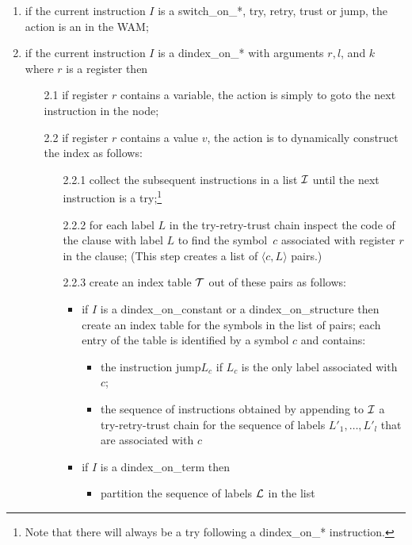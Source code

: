 \documentclass{llncs}
\newcommand{\instr}[1]{\textsf{#1}}
\newcommand{\try}{\instr{try}\xspace}
\newcommand{\retry}{\mbox{\instr{retry}}\xspace}
\newcommand{\trust}{\instr{trust}\xspace}
\newcommand{\TryRetryTrust}{\mbox{\instr{try-retry-trust}}\xspace}
\newcommand{\jump}{\instr{jump}\xspace}
\newcommand{\jitiSTAR}{\mbox{\instr{dindex\_on\_*}}\xspace}
\newcommand{\switchSTAR}{\mbox{\instr{switch\_on\_*}}\xspace}
\newcommand{\jitiONterm}{\mbox{\instr{dindex\_on\_term}}\xspace}
\newcommand{\jitiONconstant}{\mbox{\instr{dindex\_on\_constant}}\xspace}
\newcommand{\jitiONstructure}{\mbox{\instr{dindex\_on\_structure}}\xspace}
\newcommand{\JITI}{demand-driven indexing\xspace}
\begin{document}
\begin{Algorithm}[t]
  \caption{Actions of the abstract machine with \JITI}
  \label{alg:construction}
  \begin{enumerate}
  \item if the current instruction $I$ is a \switchSTAR, \try, \retry,
    \trust or \jump, the action is an in the WAM;
  \item if the current instruction $I$ is a \jitiSTAR with arguments $r,
    l$, and $k$ where $r$ is a register then
    \begin{enumerate}
    \item[2.1] if register $r$ contains a variable, the action is simply to
      \instr{goto} the next instruction in the node;
    \item[2.2] if register $r$ contains a value $v$, the action is to
      dynamically construct the index as follows:
      \begin{itemize}
      \item[2.2.1] collect the subsequent instructions in a list $\cal I$
	until the next instruction is a \try;\footnote{Note that there
	will always be a \try following a \jitiSTAR instruction.}
      \item[2.2.2] for each label $L$ in the \TryRetryTrust chain
	inspect the code of the clause with label $L$ to find the
	symbol~$c$ associated with register $r$ in the clause; (This
	step creates a list of $\langle c, L \rangle$ pairs.)
      \item[2.2.3] create an index table $\cal T$ out of these pairs as
	follows:
	\begin{itemize}
	\item if $I$ is a \jitiONconstant or a \jitiONstructure then
	  create an index table for the symbols in the list of pairs;
	  each entry of the table is identified by a symbol $c$ and
	  contains:
	  \begin{itemize}
	  \item the instruction \jump $L_c$ if $L_c$ is the only label
	    associated with $c$;
	  \item the sequence of instructions obtained by appending to
	    $\cal I$ a \TryRetryTrust chain for the sequence of labels
	    $L'_1, \ldots, L'_l$ that are associated with $c$
	  \end{itemize}
	\item if $I$ is a \jitiONterm then
	  \begin{itemize}
	  \item partition the sequence of labels $\cal L$ in the list

\end{itemize}
\end{itemize}
\end{itemize}
\end{enumerate}
\end{enumerate}
\end{Algorithm}
\end{document}
